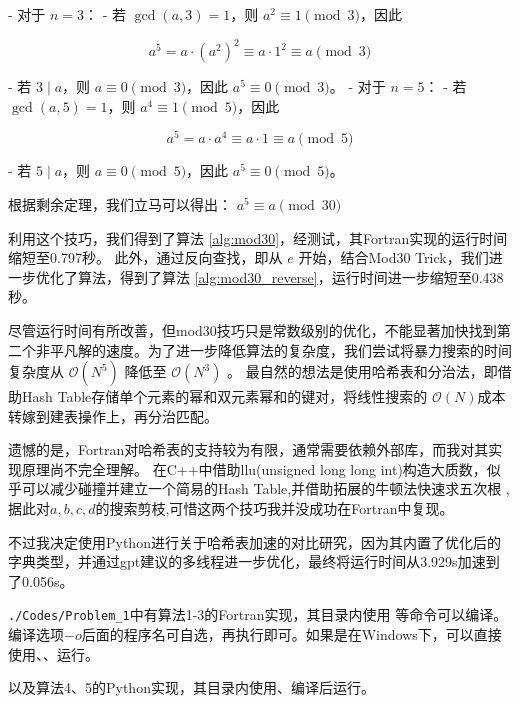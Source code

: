 - 对于 \(n = 3\)：
- 若 \(\gcd(a, 3) = 1\)，则 \(a^2 \equiv 1 \pmod{3}\)，因此

\[
    a^5 = a \cdot (a^2)^2 \equiv a \cdot 1^2 \equiv a \pmod{3}
\]

- 若 \(3 \mid a\)，则 \(a \equiv 0 \pmod{3}\)，因此 \(a^5 \equiv 0 \pmod{3}\)。
- 对于 \(n = 5\)：
- 若 \(\gcd(a, 5) = 1\)，则 \(a^4 \equiv 1 \pmod{5}\)，因此

\[
    a^5 = a \cdot a^4 \equiv a \cdot 1 \equiv a \pmod{5}
\]

- 若 \(5 \mid a\)，则 \(a \equiv 0 \pmod{5}\)，因此 \(a^5 \equiv 0 \pmod{5}\)。

根据剩余定理，我们立马可以得出：
$a^5 \equiv a \pmod{30}$

利用这个技巧，我们得到了算法 \ref{alg:mod30}，经测试，其Fortran实现的运行时间缩短至0.797秒。
此外，通过反向查找，即从 \(e\) 开始，结合Mod30 Trick，我们进一步优化了算法，得到了算法 \ref{alg:mod30_reverse}，运行时间进一步缩短至0.438秒。

尽管运行时间有所改善，但mod30技巧只是常数级别的优化，不能显著加快找到第二个非平凡解的速度。为了进一步降低算法的复杂度，我们尝试将暴力搜索的时间复杂度从 \(\mathcal{O}(N^5)\) 降低至 \(\mathcal{O}(N^3)\) 。
最自然的想法是使用哈希表和分治法，即借助Hash Table存储单个元素的幂和双元素幂和的键对，将线性搜索的 \(\mathcal{O}(N)\)成本转嫁到建表操作上，再分治匹配。

遗憾的是，Fortran对哈希表的支持较为有限，通常需要依赖外部库，而我对其实现原理尚不完全理解。
在C++中借助llu(unsigned long long int)构造大质数，似乎可以减少碰撞并建立一个简易的Hash Table,并借助拓展的牛顿法快速求五次根
,据此对$a,b,c,d$的搜索剪枝,可惜这两个技巧我并没成功在Fortran中复现。

不过我决定使用Python进行关于哈希表加速的对比研究，因为其内置了优化后的字典类型，并通过gpt建议的多线程进一步优化，最终将运行时间从3.929s加速到了0.056s。

\texttt{./Codes/Problem\_1}中有算法1-3的Fortran实现，其目录内使用
等命令可以编译。
编译选项$-o$后面的程序名可自选，再执行即可。如果是在Windows下，可以直接使用、、运行。

以及算法4、5的Python实现，其目录内使用、编译后运行。
\newpage
